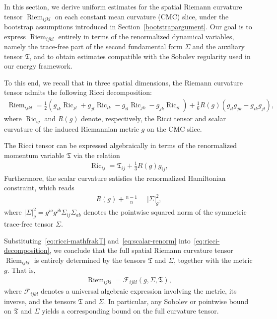 \documentclass{amsart}
\begin{document}
\label{intermediate}
\noindent  In this section, we derive uniform estimates for the spatial Riemann curvature tensor $\operatorname{Riem}_{ijkl}$ on each constant mean curvature (CMC) slice, under the bootstrap assumptions introduced in Section~\ref{bootstrapargument}. Our goal is to express $\operatorname{Riem}_{ijkl}$ entirely in terms of the renormalized dynamical variables, namely the trace-free part of the second fundamental form $\Sigma$ and the auxiliary tensor $\mathfrak{T}$, and to obtain estimates compatible with the Sobolev regularity used in our energy framework.

\noindent To this end, we recall that in three spatial dimensions, the Riemann curvature tensor admits the following Ricci decomposition:
\begin{align} \label{eq:ricci-decomposition}
\operatorname{Riem}_{ijkl}
= \frac{1}{2}\left( g_{ik} \operatorname{Ric}_{jl} + g_{jl} \operatorname{Ric}_{ik} - g_{il} \operatorname{Ric}_{jk} - g_{jk} \operatorname{Ric}_{il} \right)
+ \frac{1}{6} R(g) \left( g_{il} g_{jk} - g_{ik} g_{jl} \right),
\end{align}
where $\operatorname{Ric}_{ij}$ and $R(g)$ denote, respectively, the Ricci tensor and scalar curvature of the induced Riemannian metric $g$ on the CMC slice.

\noindent The Ricci tensor can be expressed algebraically in terms of the renormalized momentum variable $\mathfrak{T}$ via the relation
\begin{align} \label{eq:ricci-mathfrakT}
\operatorname{Ric}_{ij} = \mathfrak{T}_{ij} + \frac{1}{3}R(g) g_{ij},
\end{align}
Furthermore, the scalar curvature satisfies the renormalized Hamiltonian constraint, which reads
\begin{align} \label{eq:scalar-renorm}
R(g) + \frac{n-1}{n} = |\Sigma|_g^2,
\end{align}
where $|\Sigma|_g^2 = g^{ia}g^{jb} \Sigma_{ij} \Sigma_{ab}$ denotes the pointwise squared norm of the symmetric trace-free tensor $\Sigma$.

\noindent Substituting~\eqref{eq:ricci-mathfrakT} and~\eqref{eq:scalar-renorm} into~\eqref{eq:ricci-decomposition}, we conclude that the full spatial Riemann curvature tensor $\operatorname{Riem}_{ijkl}$ is entirely determined by the tensors $\mathfrak{T}$ and $\Sigma$, together with the metric $g$. That is,
\begin{align} \label{eq:riem-sigma-mathfrakT}
\operatorname{Riem}_{ijkl} = \mathcal{F}_{ijkl}(g,\Sigma,\mathfrak{T}),
\end{align}
where $\mathcal{F}_{ijkl}$ denotes a universal algebraic expression involving the metric, its inverse, and the tensors $\mathfrak{T}$ and $\Sigma$. In particular, any Sobolev or pointwise bound on $\mathfrak{T}$ and $\Sigma$ yields a corresponding bound on the full curvature tensor.
\end{document}
